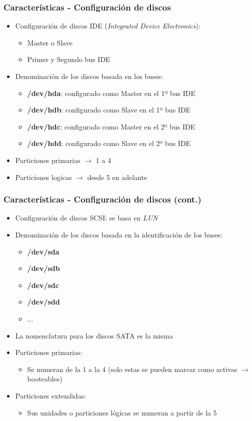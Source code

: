 \begin{frame}
  \frametitle{Características - Configuración de discos}
  \begin{itemize}
	  \item Configuración de discos IDE (\textit{Integrated Device Electronics}):
	  \begin{itemize}
	  	\item Master o Slave
	  	\item Primer y Segundo bus IDE
	  \end{itemize}
	  \item Denominación de los discos basada en los buses:
	  \begin{itemize}
	  	\item \textbf{/dev/hda}: configurado como Master en el 1º bus IDE
	  	\item \textbf{/dev/hdb}: configurado como Slave en el 1º bus IDE
	  	\item \textbf{/dev/hdc}: configurado como Master en el 2º bus IDE
	  	\item \textbf{/dev/hdd}: configurado como Slave en el 2º bus IDE
	  \end{itemize}
	  \item Particiones primarias $\rightarrow$ 1 a 4
	  \item Particiones logicas $\rightarrow$ desde 5 en adelante
  \end{itemize}
\end{frame}

\begin{frame}
  \frametitle{Características - Configuración de discos (cont.)}
  \begin{itemize}
	  \item Configuración de discos SCSI: se basa en \textit{LUN}
	  \item Denominación de los discos basada en la identificación de los buses:
	  \begin{itemize}
	  	\item \textbf{/dev/sda}
	  	\item \textbf{/dev/sdb}
	  	\item \textbf{/dev/sdc}
	  	\item \textbf{/dev/sdd}
	  	\item ...
	  \end{itemize}
	  \item La nomenclatura para los discos SATA es la misma
	  \item Particiones primarias:
	  \begin{itemize}
	  	\item Se numeran de la 1 a la 4 (solo estas se pueden marcar como activas $\rightarrow$ booteables)
	  \end{itemize}
	  \item Particiones extendidas:
	  \begin{itemize}
	  	\item Sus unidades o particiones lógicas se numeran a partir de la 5
	  \end{itemize}	  
  \end{itemize}
\end{frame}

